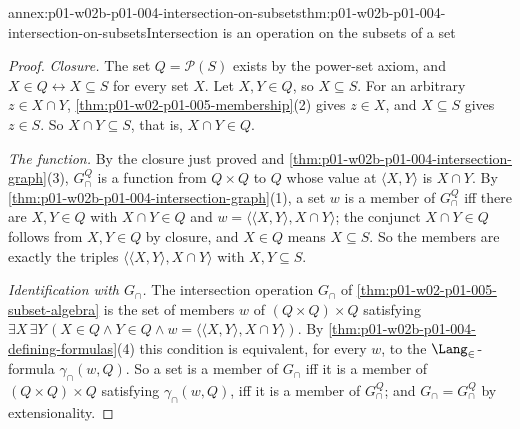 \begin{annexitem}{annex:p01-w02b-p01-004-intersection-on-subsets}{thm:p01-w02b-p01-004-intersection-on-subsets}{Intersection is an operation on the subsets of a set}
\begin{proof}
\emph{Closure.} The set \(Q=\mathcal P(S)\) exists by the power-set axiom, and
\(X\in Q\leftrightarrow X\subseteq S\) for every set \(X\). Let \(X,Y\in Q\), so
\(X\subseteq S\). For an arbitrary \(z\in X\cap Y\),
\cref{thm:p01-w02-p01-005-membership}(2) gives \(z\in X\), and \(X\subseteq S\)
gives \(z\in S\). So \(X\cap Y\subseteq S\), that is, \(X\cap Y\in Q\).

\emph{The function.} By the closure just proved and
\cref{thm:p01-w02b-p01-004-intersection-graph}(3), \(G^{Q}_{\cap}\) is a
function from \(Q\times Q\) to \(Q\) whose value at \(\langle X,Y\rangle\) is
\(X\cap Y\). By \cref{thm:p01-w02b-p01-004-intersection-graph}(1), a set \(w\)
is a member of \(G^{Q}_{\cap}\) iff there are \(X,Y\in Q\) with \(X\cap Y\in Q\)
and \(w=\langle\langle X,Y\rangle,X\cap Y\rangle\); the conjunct
\(X\cap Y\in Q\) follows from \(X,Y\in Q\) by closure, and \(X\in Q\) means
\(X\subseteq S\). So the members are exactly the triples
\(\langle\langle X,Y\rangle,X\cap Y\rangle\) with \(X,Y\subseteq S\).

\emph{Identification with \(G_{\cap}\).} The intersection operation \(G_{\cap}\)
of \cref{thm:p01-w02-p01-005-subset-algebra} is the set of members \(w\) of
\((Q\times Q)\times Q\) satisfying
\(\exists X\,\exists Y\,(X\in Q\land Y\in Q\land
w=\langle\langle X,Y\rangle,X\cap Y\rangle)\). By
\cref{thm:p01-w02b-p01-004-defining-formulas}(4) this condition is equivalent,
for every \(w\), to the \(\Lang_{\in}\)-formula \(\gamma_{\cap}(w,Q)\). So a set
is a member of \(G_{\cap}\) iff it is a member of \((Q\times Q)\times Q\)
satisfying \(\gamma_{\cap}(w,Q)\), iff it is a member of \(G^{Q}_{\cap}\); and
\(G_{\cap}=G^{Q}_{\cap}\) by extensionality.
\end{proof}
\end{annexitem}
